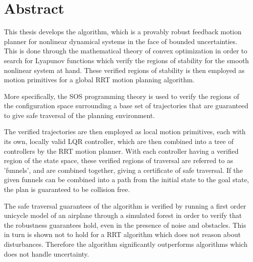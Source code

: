 \chapter*{Abstract}

\abstractintoc{} %
\abstractnum %


This thesis develops the \rrtfunnel{} algorithm, which is a provably robust
feedback motion planner for nonlinear dynamical systems in the face of bounded
uncertainties. This is done through the mathematical theory of convex
optimization in order to search for Lyapunov functions which verify the
regions of stability for the smooth nonlinear system at hand. These verified
regions of stability is then employed as motion primitives for a global
\ac{RRT} motion planning algorithm.

More specifically, the \ac{SOS} programming theory is used to verify the
regions of the configuration space surrounding a base set of trajectories that
are guaranteed to give safe traversal of the planning environment.

The verified trajectories are then employed as local motion primitives, each
with its own, locally valid \ac{LQR} controller, which are then combined into
a tree of controllers by the \ac{RRT} motion planner. With each controller
having a verified region of the state space, these verified regions of
traversal are referred to as 'funnels', and are combined together, giving a
certificate of safe traversal. If the given funnels can be combined into a
path from the initial state to the goal state, the plan is guaranteed to be
collision free.

The safe traversal guarantees of the algorithm is verified by running a first
order unicycle model of an airplane through a simulated forest in order to
verify that the robustness guarantees hold, even in the presence of noise and
obstacles. This in turn is shown not to hold for a \ac{RRT} algorithm which does
not reason about disturbances. Therefore the \rrtfunnel{} algorithm
significantly outperforms algorithms which does not handle uncertainty.


